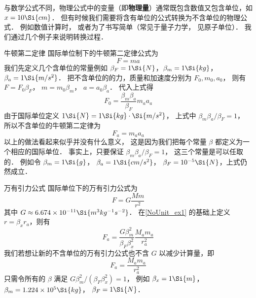 

与数学公式不同，物理公式中的变量（即\textbf{物理量}）通常既包含数值又包含单位，如 $x = 10\Si{cm}$． 但有时候我们需要将含有单位的公式转换为不含单位的物理公式． 例如数值计算时， 或者为了书写简单（常见于量子力学， 见原子单位）． 我们通过几个例子来说明转换过程．

\begin{example}{牛顿第二定律}\label{NoUnit_ex1}
国际单位制下的牛顿第二定律公式为
\begin{equation}
F = ma
\end{equation}
我们先定义几个含单位的常量例如 $\beta_{F} = 1\Si{N}$，$\beta_{m} = 1\Si{kg}$，$\beta_{a} = 1\Si{m/s^2}$． 把不含单位的的力，质量和加速度分别为 $F_0, m_0, a_0$， 则有 $F = F_0 \beta_F$， $m = m_0 \beta_{m}$， $a = a_0 \beta_{a}$． 代入上式得
\begin{equation}
F_0 = \frac{\beta_m \beta_a}{\beta_F} m_a  a_a
\end{equation}
由于国际单位定义 $1\Si{N} = 1\Si{kg}\cdot\Si{m/s^2}$， 上式中 $\beta_m \beta_a/\beta_F = 1$， 所以不含单位的牛顿第二定律为
\begin{equation}\label{NoUnit_eq3}
F_a = m_a a_a
\end{equation}
以上的做法看起来似乎并没有什么意义， 这是因为我们把每个常量 $\beta$ 都定义为一个相应的国际单位． 事实上，只要保证 $\beta_m \beta_a/\beta_F = 1$， 这三个常量是可以任取的． 例如令 $\beta_m = 1\Si{g}$， $\beta_a = 1\Si{cm/s^2}$， $\beta_F = 10^{-5}\Si{N}$，上式仍然成立．
\end{example}

\begin{example}{万有引力公式}
国际单位下的万有引力公式为
\begin{equation}
F = G\frac{Mm}{r^2}
\end{equation}
其中 $G \approx 6.674\times 10^{-11} \Si{m^3 kg^{-1} s^{-2}}$． 在\autoref{NoUnit_ex1} 的基础上定义 $r = \beta_x r_a$，则有
\begin{equation}
F_a = \frac{G\beta_m^2}{\beta_F \beta_x^2} \frac{M_a m_a}{r_a^2}
\end{equation}
我们若想让新的不含单位的万有引力公式也不含 $G$ 以减少计算量，即
\begin{equation}\label{NoUnit_eq6}
F_a = \frac{M_a m_a}{r_a^2}
\end{equation}
只需令所有的 $\beta$ 满足 $G\beta_m^2/(\beta_F\beta_x^2) = 1$， 例如 $\beta_x = 1\Si{m}$， $\beta_m = 1.224\times 10^5 \Si{kg}$， $\beta_F = 1\Si{N}$．
\end{example}

